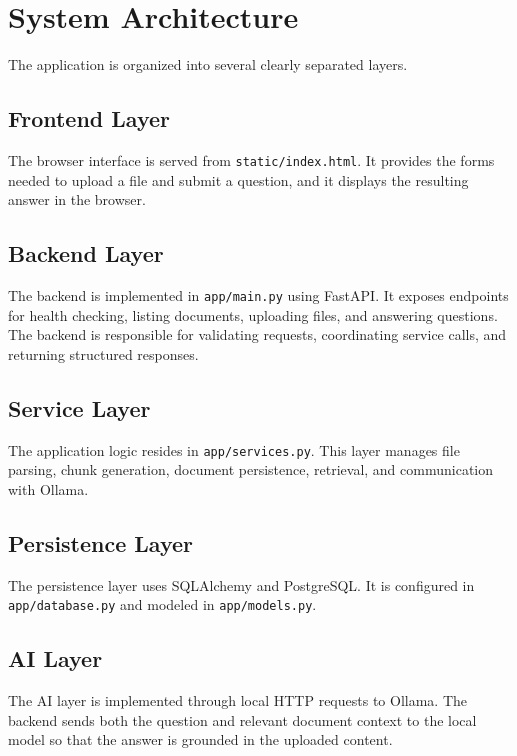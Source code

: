 ﻿\documentclass[11pt,a4paper]{article}
\begin{document}
\section{System Architecture}
The application is organized into several clearly separated layers.

\subsection{Frontend Layer}
The browser interface is served from \texttt{static/index.html}. It provides the forms needed to upload a file and submit a question, and it displays the resulting answer in the browser.

\subsection{Backend Layer}
The backend is implemented in \texttt{app/main.py} using FastAPI. It exposes endpoints for health checking, listing documents, uploading files, and answering questions. The backend is responsible for validating requests, coordinating service calls, and returning structured responses.

\subsection{Service Layer}
The application logic resides in \texttt{app/services.py}. This layer manages file parsing, chunk generation, document persistence, retrieval, and communication with Ollama.

\subsection{Persistence Layer}
The persistence layer uses SQLAlchemy and PostgreSQL. It is configured in \texttt{app/database.py} and modeled in \texttt{app/models.py}.

\subsection{AI Layer}
The AI layer is implemented through local HTTP requests to Ollama. The backend sends both the question and relevant document context to the local model so that the answer is grounded in the uploaded content.
\end{document}
